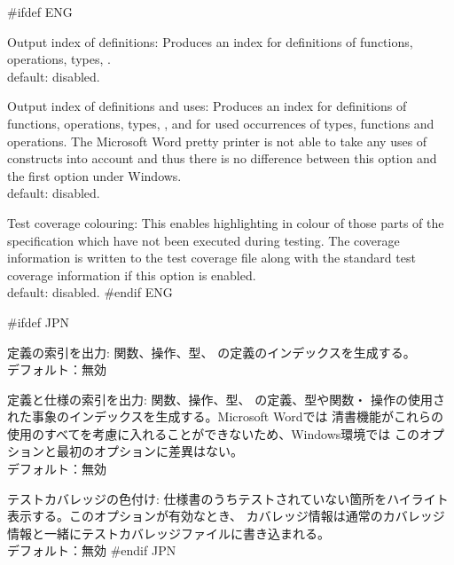 \documentclass[\pformat,12pt]{article}
\newcommand{\guicmd}[1]{{\sf #1}}
\newcommand{\guicmd}[1]{{\gt #1}}
\begin{document}
\begin{list}{}{}

#ifdef ENG
\item[{\sf Output index of definitions}:] Produces an index for
  definitions of functions, operations, types,
  . \\
  default: disabled.
  
\item[{\sf Output index of definitions and uses}:] Produces an index for
  definitions of functions, operations, types,
  , and for used occurrences of types,
    functions and operations. The Microsoft Word pretty printer is not
    able to take any uses of constructs into account and thus there is
    no difference between this option and the first option under
    Windows.\\ 
  default: disabled.

\item[{\sf Test coverage colouring}:] This enables highlighting
  in colour of those parts of the specification which have not been
  executed during testing. The coverage information is written to the
  test coverage file along with the standard test coverage information
  if this option is enabled. \\
  default: disabled.
#endif ENG

#ifdef JPN
\item[{\guicmd{定義の索引を出力}}:]
  関数、操作、型、
    の定義のインデックスを生成する。\\
  デフォルト：無効
\item[{\guicmd{定義と仕様の索引を出力}}:]
  関数、操作、型、%
   の定義、型や関数・
  操作の使用された事象のインデックスを生成する。Microsoft Wordでは
  清書機能がこれらの使用のすべてを考慮に入れることができないため、Windows環境では
  このオプションと最初のオプションに差異はない。\\
  デフォルト：無効

\item[{\guicmd{テストカバレッジの色付け}}:]
  仕様書のうちテストされていない箇所をハイライト表示する。このオプションが有効なとき、
  カバレッジ情報は通常のカバレッジ情報と一緒にテストカバレッジファイルに書き込まれる。\\
  デフォルト：無効
#endif JPN

\end{list}
\end{document}
